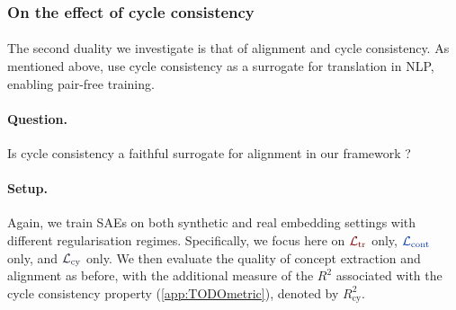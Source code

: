 \documentclass{article}
\begin{document}
\begin{table}[h]
  \centering
  \caption{\textbf{In practice, neither loss is sufficient}. SAE quality on \textbf{vision embeddings} under different regularisation regimes.}
  \label{tab:translation_vs_concept_consistency_real}
\end{table}

\subsubsection{On the effect of cycle consistency}
\label{sec:cycle_consistency}

\paragraph{}The second duality we investigate is that of alignment and cycle consistency. As mentioned above, \citet{TODO} use cycle consistency as a surrogate for translation in NLP, enabling pair-free training. 
\paragraph{Question.} Is cycle consistency a faithful surrogate for alignment in our framework ?
\paragraph{Setup.} Again, we train SAEs on both synthetic and real embedding settings with different regularisation regimes. Specifically, we focus here on $\Ltr$ only, $\Lcont$ only, and $\Lcy$ only. We then evaluate the quality of concept extraction and alignment as before, with the additional measure of the $R^2$ associated with the cycle consistency property (\cref{app:TODOmetric}), denoted by $R^2_{\mathrm{cy}}$.
\end{document}
